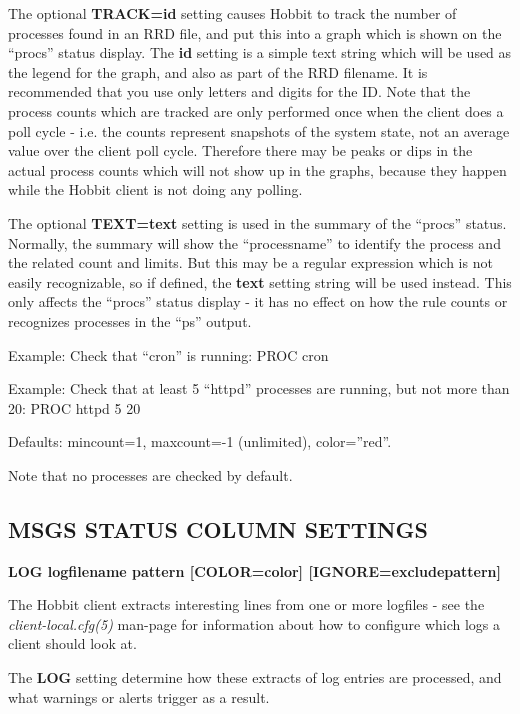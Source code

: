   The optional \textbf{TRACK=id}
 setting causes Hobbit to track the number of processes found in an RRD file, and put this into a graph which is shown on the ``procs'' status display. The \textbf{id}
 setting is a simple text string which will be used as the legend for the graph, and also as part of the RRD filename. It is recommended that you use only letters and digits for the ID.  
 Note that the process counts which are tracked are only performed once when the client does a poll cycle - i.e. the counts represent snapshots of the system state, not an average value over the client poll cycle. Therefore there may be peaks or dips in the actual process counts which will not show up in the graphs, because they happen while the Hobbit client is not doing any polling. 


  The optional \textbf{TEXT=text}
 setting is used in the summary of the ``procs'' status. Normally, the summary will show the ``processname'' to identify the process and the related count and limits. But this may be a regular expression which is not easily recognizable, so if defined, the \textbf{text}
 setting string will be used instead. This only affects the ``procs'' status display - it has no effect on how the rule counts or recognizes processes in the ``ps'' output. 


  Example: Check that ``cron'' is running:  
PROC cron 



  Example: Check that at least 5 ``httpd'' processes are running, but not more than 20:  
PROC httpd 5 20 



  Defaults:  
mincount=1, maxcount=-1 (unlimited), color=''red''. 
 
Note that no processes are checked by default. 



 
\subsection{MSGS STATUS COLUMN SETTINGS}


 \textbf{LOG logfilename pattern [COLOR=color] [IGNORE=excludepattern]}



  The Hobbit client extracts interesting lines from one or more logfiles - see the \emph{client-local.cfg(5)}
 man-page for information about how to configure which logs a client should look at. 


  The \textbf{LOG}
 setting determine how these extracts of log entries are processed, and what warnings or alerts trigger as a result. 


